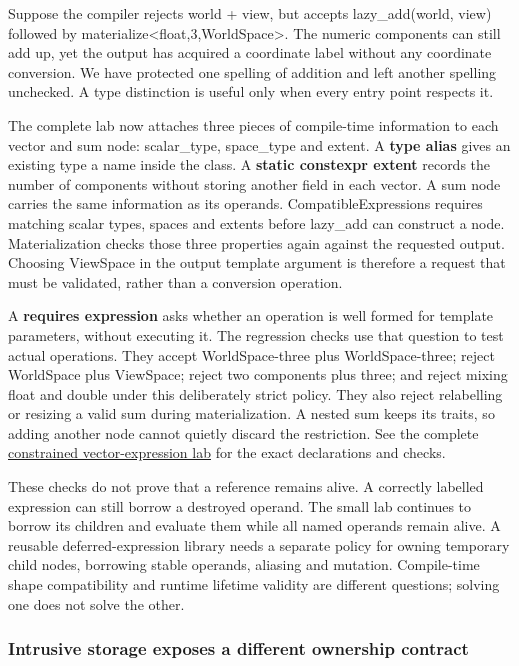 Suppose the compiler rejects world + view, but accepts lazy\_add(world, view) followed by materialize\textless float,3,WorldSpace\textgreater. The numeric components can still add up, yet the output has acquired a coordinate label without any coordinate conversion. We have protected one spelling of addition and left another spelling unchecked. A type distinction is useful only when every entry point respects it.

The complete lab now attaches three pieces of compile-time information to each vector and sum node: scalar\_type, space\_type and extent. A \textbf{type alias} gives an existing type a name inside the class. A \textbf{static constexpr extent} records the number of components without storing another field in each vector. A sum node carries the same information as its operands. CompatibleExpressions requires matching scalar types, spaces and extents before lazy\_add can construct a node. Materialization checks those three properties again against the requested output. Choosing ViewSpace in the output template argument is therefore a request that must be validated, rather than a conversion operation.

A \textbf{requires expression} asks whether an operation is well formed for template parameters, without executing it. The regression checks use that question to test actual operations. They accept WorldSpace-three plus WorldSpace-three; reject WorldSpace plus ViewSpace; reject two components plus three; and reject mixing float and double under this deliberately strict policy. They also reject relabelling or resizing a valid sum during materialization. A nested sum keeps its traits, so adding another node cannot quietly discard the restriction. See the complete \href{tools/m018/m018_lab.cpp}{constrained vector-expression lab} for the exact declarations and checks.

These checks do not prove that a reference remains alive. A correctly labelled expression can still borrow a destroyed operand. The small lab continues to borrow its children and evaluate them while all named operands remain alive. A reusable deferred-expression library needs a separate policy for owning temporary child nodes, borrowing stable operands, aliasing and mutation. Compile-time shape compatibility and runtime lifetime validity are different questions; solving one does not solve the other.

\subsubsection{Intrusive storage exposes a different ownership contract}\label{intrusive-storage-exposes-a-different-ownership-contract}

